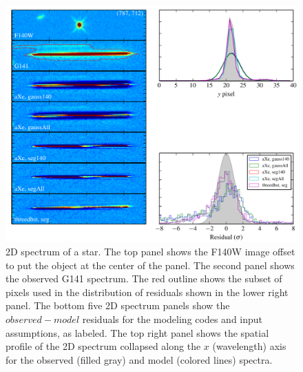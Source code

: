 \documentclass[12pt]{article}
\begin{document}
\begin{figure}
    \includegraphics[scale=0.9, angle=0.0]{Figures/compare_model_star.pdf}
    \caption{2D spectrum of a star.  The top panel shows the F140W image offset to put the object at the center of the panel.  The second panel shows the observed G141 spectrum.  The red outline shows the subset of pixels used in the distribution of residuals shown in the lower right panel.  The bottom five 2D spectrum panels show the $observed-model$ residuals for the modeling codes and input assumptions, as labeled.  The top right panel shows the spatial profile of the 2D spectrum collapsed along the $x$ (wavelength) axis for the observed (filled gray) and model (colored lines) spectra.}
    \label{fig:star2D}
\end{figure}
\end{document}

